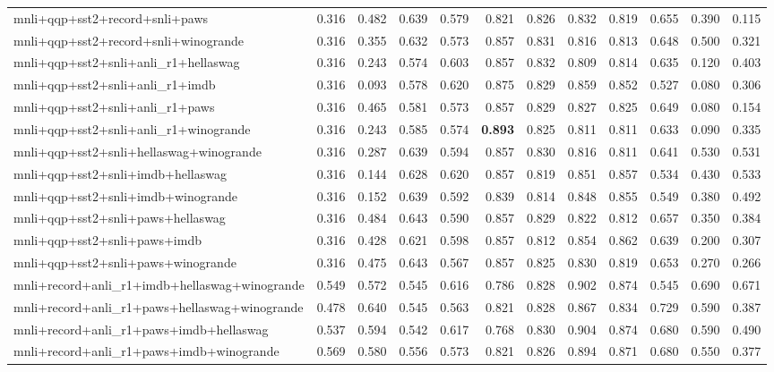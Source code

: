 \begin{table}[t]
\begin{tabular}{lrrrrrrrrrrr}
    mnli+qqp+sst2+record+snli+paws & 0.316 & 0.482 & 0.639 & 0.579 & 0.821 & 0.826 & 0.832 & 0.819 & 0.655 & 0.390 & 0.115 \\
    mnli+qqp+sst2+record+snli+winogrande & 0.316 & 0.355 & 0.632 & 0.573 & 0.857 & 0.831 & 0.816 & 0.813 & 0.648 & 0.500 & 0.321 \\
    mnli+qqp+sst2+snli+anli\_r1+hellaswag & 0.316 & 0.243 & 0.574 & 0.603 & 0.857 & 0.832 & 0.809 & 0.814 & 0.635 & 0.120 & 0.403 \\
    mnli+qqp+sst2+snli+anli\_r1+imdb & 0.316 & 0.093 & 0.578 & 0.620 & 0.875 & 0.829 & 0.859 & 0.852 & 0.527 & 0.080 & 0.306 \\
    mnli+qqp+sst2+snli+anli\_r1+paws & 0.316 & 0.465 & 0.581 & 0.573 & 0.857 & 0.829 & 0.827 & 0.825 & 0.649 & 0.080 & 0.154 \\
    mnli+qqp+sst2+snli+anli\_r1+winogrande & 0.316 & 0.243 & 0.585 & 0.574 & \textbf{0.893} & 0.825 & 0.811 & 0.811 & 0.633 & 0.090 & 0.335 \\
    mnli+qqp+sst2+snli+hellaswag+winogrande & 0.316 & 0.287 & 0.639 & 0.594 & 0.857 & 0.830 & 0.816 & 0.811 & 0.641 & 0.530 & 0.531 \\
    mnli+qqp+sst2+snli+imdb+hellaswag & 0.316 & 0.144 & 0.628 & 0.620 & 0.857 & 0.819 & 0.851 & 0.857 & 0.534 & 0.430 & 0.533 \\
    mnli+qqp+sst2+snli+imdb+winogrande & 0.316 & 0.152 & 0.639 & 0.592 & 0.839 & 0.814 & 0.848 & 0.855 & 0.549 & 0.380 & 0.492 \\
    mnli+qqp+sst2+snli+paws+hellaswag & 0.316 & 0.484 & 0.643 & 0.590 & 0.857 & 0.829 & 0.822 & 0.812 & 0.657 & 0.350 & 0.384 \\
    mnli+qqp+sst2+snli+paws+imdb & 0.316 & 0.428 & 0.621 & 0.598 & 0.857 & 0.812 & 0.854 & 0.862 & 0.639 & 0.200 & 0.307 \\
    mnli+qqp+sst2+snli+paws+winogrande & 0.316 & 0.475 & 0.643 & 0.567 & 0.857 & 0.825 & 0.830 & 0.819 & 0.653 & 0.270 & 0.266 \\
    mnli+record+anli\_r1+imdb+hellaswag+winogrande & 0.549 & 0.572 & 0.545 & 0.616 & 0.786 & 0.828 & 0.902 & 0.874 & 0.545 & 0.690 & 0.671 \\
    mnli+record+anli\_r1+paws+hellaswag+winogrande & 0.478 & 0.640 & 0.545 & 0.563 & 0.821 & 0.828 & 0.867 & 0.834 & 0.729 & 0.590 & 0.387 \\
    mnli+record+anli\_r1+paws+imdb+hellaswag & 0.537 & 0.594 & 0.542 & 0.617 & 0.768 & 0.830 & 0.904 & 0.874 & 0.680 & 0.590 & 0.490 \\
    mnli+record+anli\_r1+paws+imdb+winogrande & 0.569 & 0.580 & 0.556 & 0.573 & 0.821 & 0.826 & 0.894 & 0.871 & 0.680 & 0.550 & 0.377 \\

\end{tabular}
\end{table}
